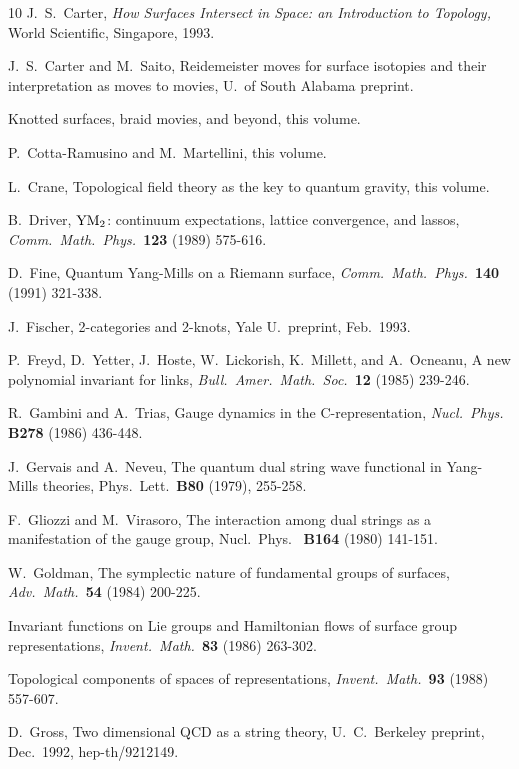 \begin{thebibliography} {10}
  J.\ S.\ Carter, {\sl How Surfaces Intersect in
Space: an Introduction to Topology,} World Scientific,
Singapore, 1993.

 J.\ S.\ Carter and M.\ Saito, Reidemeister
moves for surface isotopies and their interpretation as moves to movies,
U.\ of South Alabama preprint.

Knotted surfaces, braid movies, and beyond, this volume.

  P.\ Cotta-Ramusino and M.\ Martellini, this
volume.

  L.\ Crane, Topological field theory as the key to
quantum gravity, this volume.

 B.\ Driver, ${\rm YM_2}$: continuum expectations,
lattice convergence, and lassos, {\sl Comm.\ Math.\ Phys.\ }{\bf 123}
(1989) 575-616.

 D.\ Fine, Quantum Yang-Mills on a Riemann surface, {\sl
Comm.\ Math.\ Phys.\ }{\bf 140} (1991) 321-338.

  J.\ Fischer, 2-categories
and 2-knots, Yale U.\ preprint, Feb.\ 1993.

  P.\ Freyd, D.\ Yetter, J.\ Hoste,
W.\ Lickorish, K.\ Millett, and A.\ Ocneanu,
A new polynomial invariant for
links, {\sl Bull.\ Amer.\ Math.\ Soc.\ }{\bf 12} (1985) 239-246.

 R.\ Gambini and A.\ Trias, Gauge dynamics in the
C-representation, {\sl Nucl.\ Phys. }{\bf B278} (1986) 436-448.

 J.\ Gervais and A.\ Neveu, The quantum dual string wave
functional in Yang-Mills theories, Phys.\ Lett.\ {\bf B80}
(1979), 255-258.

 F.\ Gliozzi and M.\ Virasoro, The interaction among dual
strings as a manifestation of the gauge group, {Nucl.\ Phys.\ }{\bf
B164} (1980) 141-151.

 W.\ Goldman, The symplectic nature of fundamental
groups of surfaces, {\sl Adv.\ Math.\ }{\bf 54} (1984) 200-225.

Invariant functions on Lie groups and Hamiltonian flows of surface
group representations, {\sl Invent.\ Math.\ }{\bf 83} (1986) 263-302.

Topological components of spaces of representations, {\sl Invent.\
Math.\ }{\bf 93} (1988) 557-607.

 D.\ Gross, Two dimensional QCD as a string theory,
U.\ C.\ Berkeley preprint, Dec.\ 1992, hep-th/9212149.


\end{thebibliography}
